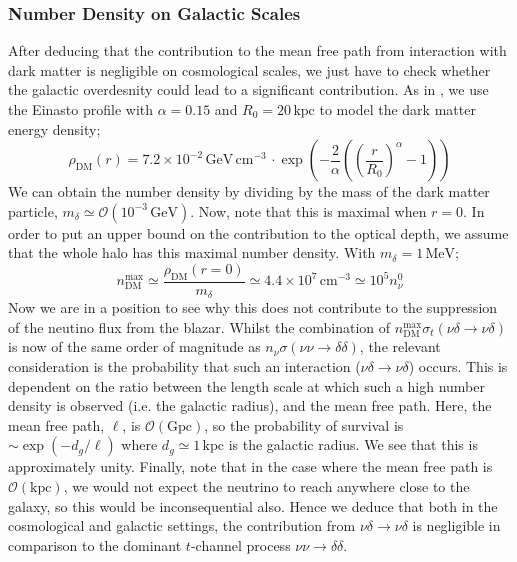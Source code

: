 \documentclass[11pt]{article}
\numberwithin{equation}{section}
\numberwithin{figure}{section}
\numberwithin{table}{section}
\newcommand{\mO}{\mathcal{O}}
\begin{document}
\subsubsection{Number Density on Galactic Scales}
After deducing that the contribution to the mean free path from interaction with dark matter is negligible on cosmological scales, we just have to check whether the galactic overdesnity could lead to a significant contribution. As in \cite{Franarin2018}, we use the Einasto profile with $\alpha = 0.15$ and $R_0 = 20\,\textrm{kpc}$ to model the dark matter energy density;
\begin{equation}
  \rho_{\textrm{DM}}(r) = 7.2 \times 10^{-2}\,\textrm{GeV} \, \textrm{cm}^{-3}\, \cdot \exp\left(-\frac{2}{\alpha}\left(\left(\frac{r}{R_0}\right)^\alpha - 1\right)\right)
\end{equation}
We can obtain the number density by dividing by the mass of the dark matter particle, $m_\delta \simeq \mO(10^{-3} \, \textrm{GeV})$. Now, note that this is maximal when $r = 0$. In order to put an upper bound on the contribution to the optical depth, we assume that the whole halo has this maximal number density. With $m_\delta = 1\, \textrm{MeV}$;
\begin{equation}
  n_{\textrm{DM}}^{\textrm{max}} \simeq \frac{\rho_{\textrm{DM}}(r = 0)}{m_\delta} \simeq 4.4 \times 10^{7} \, \textrm{cm}^{-3} \simeq 10^{5} n^0_{\nu}
\end{equation}
Now we are in a position to see why this does not contribute to the suppression of the neutino flux from the blazar. Whilst the combination of $n^{\textrm{max}}_{\textrm{DM}} \sigma_t(\nu\delta\rightarrow\nu\delta)$ is now of the same order of magnitude as $n_\nu \sigma(\nu\nu\rightarrow \delta\delta)$, the relevant consideration is the probability that such an interaction ($\nu\delta \rightarrow \nu\delta$) occurs. This is dependent on the ratio between the length scale at which such a high number density is observed (i.e. the galactic radius), and the mean free path. Here, the mean free path, $\ell$, is $\mO(\textrm{Gpc})$, so the probability of survival is $\sim \exp(-d_{g}/\ell)$ where $d_g \simeq 1\,\textrm{kpc}$ is the galactic radius. We see that this is approximately unity. Finally, note that in the case where the mean free path is $\mO(\textrm{kpc})$, we would not expect the neutrino to reach anywhere close to the galaxy, so this would be inconsequential also. Hence we deduce that both in the cosmological and galactic settings, the contribution from $\nu\delta \rightarrow \nu\delta$ is negligible in comparison to the dominant $t$-channel process $\nu\nu \rightarrow \delta\delta$.
\end{document}
